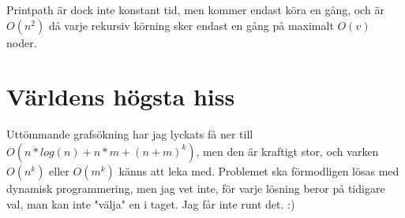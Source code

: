 \documentclass[a4paper,10pt,twoside]{article}
\begin{document}
Printpath är dock inte konstant tid, men kommer endast köra en gång, och är $O(n^2)$ då varje rekursiv körning sker endast en gång på maximalt $O(v)$ noder.

\section{Världens högsta hiss}

Uttömmande grafsökning har jag lyckats få ner till $O(n*log(n)+n*m+(n+m)^k)$, men den är kraftigt stor, och varken $O(n^k)$ eller $O(m^k)$ känns att leka med. Problemet ska förmodligen lösas med dynamisk programmering, men jag vet inte, för varje lösning beror på tidigare val, man kan inte "välja" en i taget. Jag får inte runt det. :)
\end{document}
